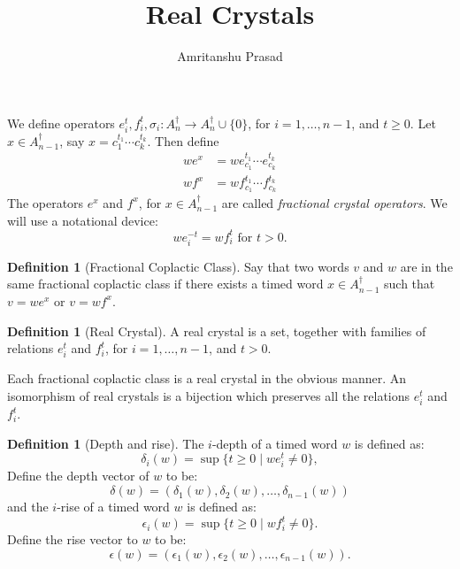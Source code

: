 \documentclass[12pt]{amsproc}
\title{Real Crystals}
\author{Amritanshu Prasad}
\theoremstyle{definition}
\newtheorem{definition}[theorem]{Definition}
\begin{document}
\maketitle
We define operators $e_i^t, f_i^t, \sigma_i:A_n^\dagger\to A_n^\dagger\cup \{0\}$, for $i=1,\dotsc,n-1$, and $t\geq 0$.
Let $x\in A_{n-1}^\dagger$, say $x=c_1^{t_1}\dotsb c_k^{t_k}$.
Then define
\begin{align*}
  we^x & = w e_{c_1}^{t_1}\dotsb e_{c_k}^{t_k}\\
  w f^x & = w f_{c_1}^{t_1}\dotsb f_{c_k}^{t_k}
\end{align*}
The operators $e^x$ and $f^x$, for $x\in A_{n-1}^\dagger$ are called \emph{fractional crystal operators}.
We will use a notational device:
\begin{displaymath}
  we_i^{-t} = wf_i^t \text{ for } t>0.
\end{displaymath}
\begin{definition}[Fractional Coplactic Class]
  Say that two words $v$ and $w$ are in the same fractional coplactic class if there exists a timed word $x\in A_{n-1}^\dagger$ such that $v=we^x$ or $v=wf^x$.
\end{definition}
\begin{definition}[Real Crystal]
  A real crystal is a set, together with families of relations $e_i^t$ and $f_i^t$, for $i=1,\dotsc,n-1$, and $t>0$.
\end{definition}
Each fractional coplactic class is a real crystal in the obvious manner.
An isomorphism of real crystals is a bijection which preserves all the relations $e_i^t$ and $f_i^t$.
\begin{definition}
  [Depth and rise]
  The $i$-depth of a timed word $w$ is defined as:
  \begin{displaymath}
    \delta_i(w)=\sup\{t\geq 0\mid we_i^t\neq 0\},
  \end{displaymath}
  Define the depth vector of $w$ to be:
  \begin{displaymath}
    \delta(w) = (\delta_1(w),\delta_2(w),\dotsc,\delta_{n-1}(w))
  \end{displaymath}
  and the $i$-rise of a timed word $w$ is defined as:
  \begin{displaymath}
    \epsilon_i(w) = \sup\{t\geq 0\mid wf_i^t\neq 0\}.
  \end{displaymath}
  Define the rise vector to $w$ to be:
  \begin{displaymath}
    \epsilon(w) = (\epsilon_1(w),\epsilon_2(w),\dotsc,\epsilon_{n-1}(w)).
  \end{displaymath}
\end{definition}
\end{document}
